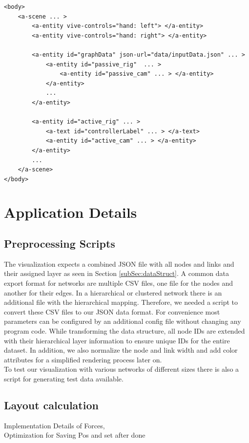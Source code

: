 \begin{lstlisting}[label={lst:virtualSceneGraph},caption=Simplified virtual A-Frame scene graph used by the application.]
<body>
    <a-scene ... >
        <a-entity vive-controls="hand: left"> </a-entity>
        <a-entity vive-controls="hand: right"> </a-entity>
        
        <a-entity id="graphData" json-url="data/inputData.json" ... >
            <a-entity id="passive_rig"  ... >  
                <a-entity id="passive_cam" ... > </a-entity>
            </a-entity>
            ...
        </a-entity>

        <a-entity id="active_rig" ... >
            <a-text id="controllerLabel" ... > </a-text>
            <a-entity id="active_cam" ... > </a-entity>
        </a-entity>
        ...
    </a-scene>
</body>
\end{lstlisting}

\section{Application Details}
\label{sec:applDetails}
\subsection{Preprocessing Scripts}
\label{sec:preprocessing}

The visualization expects a combined JSON file with all nodes and links and their assigned layer as seen in Section \ref{subSec:dataStruct}.
A common data export format for networks are multiple CSV files, one file for the nodes and another for their edges.
In a hierarchical or clustered network there is an additional file with the hierarchical mapping.
Therefore, we needed a script to convert these CSV files to our JSON data format. For convenience most parameters can be configured by an additional config file without changing any program code. 
While transforming the data structure, all node IDs are extended with their hierarchical layer information to ensure unique IDs for the entire dataset.  
In addition, we also normalize the node and link width and add color attributes for a simplified rendering process later on.\\
To test our visualization with various networks of different sizes there is also a script for generating test data available.

\subsection{Layout calculation}
\label{sec:layoutCalculation}
Implementation Details of Forces, \\
Optimization for Saving Pos and set after done

